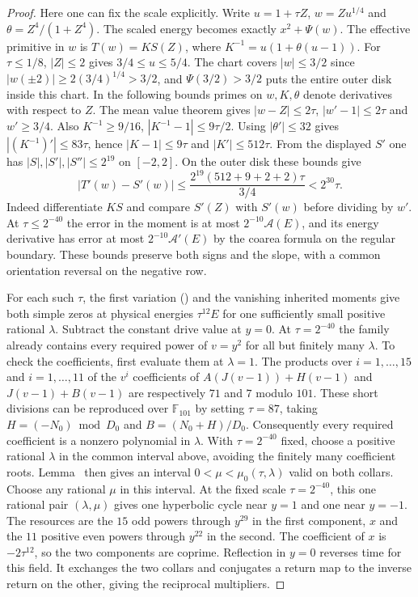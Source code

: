 \begin{proof}
Here one can fix the scale explicitly. Write $u=1+\tau Z$, $w=Zu^{1/4}$ and $\theta=Z^4/(1+Z^4)$. The scaled energy becomes exactly $x^2+\Psi(w)$. The effective primitive in $w$ is $T(w)=K S(Z)$, where $K^{-1}=u(1+\theta(u-1))$. For $\tau\le1/8$, $|Z|\le2$ gives $3/4\le u\le5/4$. The chart covers $|w|\le3/2$ since $|w(\pm2)|\ge 2(3/4)^{1/4}>3/2$, and $\Psi(3/2)>3/2$ puts the entire outer disk inside this chart. In the following bounds primes on \(w,K,\theta\) denote derivatives with respect to \(Z\). The mean value theorem gives $|w-Z|\le2\tau$, $|w'-1|\le2\tau$ and $w'\ge3/4$. Also $K^{-1}\ge9/16$, $|K^{-1}-1|\le9\tau/2$. Using $|\theta'|\le32$ gives $|(K^{-1})'|\le83\tau$, hence $|K-1|\le9\tau$ and $|K'|\le512\tau$. From the displayed $S'$ one has $|S|,|S'|,|S''|\le2^{19}$ on $[-2,2]$. On the outer disk these bounds give
\[
 |T'(w)-S'(w)|\le
 \frac{2^{19}(512+9+2+2)\tau}{3/4}<2^{30}\tau .
\]
Indeed differentiate $KS$ and compare $S'(Z)$ with $S'(w)$ before dividing by $w'$. At $\tau\le2^{-40}$ the error in the moment is at most $2^{-10}\mathcal A(E)$, and its energy derivative has error at most $2^{-10}\mathcal A'(E)$ by the coarea formula on the regular boundary. These bounds preserve both signs and the slope, with a common orientation reversal on the negative row.

For each such $\tau$, the first variation () and the vanishing inherited moments give both simple zeros at physical energies $\tau^{12}E$ for one sufficiently small positive rational $\lambda$. Subtract the constant drive value at $y=0$. At $\tau=2^{-40}$ the family already contains every required power of $v=y^2$ for all but finitely many $\lambda$. To check the coefficients, first evaluate them at $\lambda=1$. The products over $i=1,\ldots,15$ and $i=1,\ldots,11$ of the $v^i$ coefficients of $A(J(v-1))+H(v-1)$ and $J(v-1)+B(v-1)$ are respectively $71$ and $7$ modulo $101$. These short divisions can be reproduced over $\mathbb F_{101}$ by setting $\tau=87$, taking $H=(-N_0)\bmod D_0$ and $B=(N_0+H)/D_0$. Consequently every required coefficient is a nonzero polynomial in $\lambda$. With $\tau=2^{-40}$ fixed, choose a positive rational $\lambda$ in the common interval above, avoiding the finitely many coefficient roots. Lemma~ then gives an interval $0<\mu<\mu_0(\tau,\lambda)$ valid on both collars. Choose any rational \(\mu\) in this interval. At the fixed scale \(\tau=2^{-40}\), this one rational pair \((\lambda,\mu)\) gives one hyperbolic cycle near \(y=1\) and one near \(y=-1\). The resources are the $15$ odd powers through $y^{29}$ in the first component, $x$ and the $11$ positive even powers through $y^{22}$ in the second. The coefficient of $x$ is $-2\tau^{12}$, so the two components are coprime. Reflection in $y=0$ reverses time for this field. It exchanges the two collars and conjugates a return map to the inverse return on the other, giving the reciprocal multipliers.
\end{proof}

